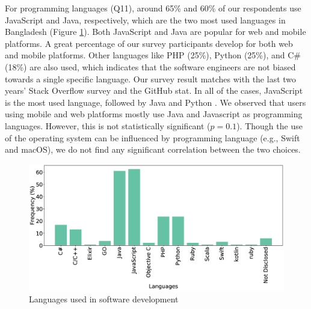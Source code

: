 For programming languages (Q11), around 65\% and 60\% of our respondents use JavaScript and
Java, respectively, which are the two most used languages in Bangladesh (Figure
\ref{fig:languages}). Both JavaScript and Java are popular for web and mobile
platforms. A great percentage of our survey participants develop for both
web and mobile platforms. Other languages
like PHP (25\%), Python (25\%), and C\# (18\%) are also used, which indicates
that the software engineers are not biased towards a single specific language.
Our survey result matches with the last two years' Stack Overflow survey and the
GitHub stat. In all of the cases, JavaScript is the most used language, followed
by Java and Python \cite{StackoverflowSurvey2020, StackoverflowSurvey2019,
GithubStat}. We
observed that users using mobile and web platforms mostly use Java and
Javascript as programming languages. However, this is not statistically
significant ($p=0.1$). Though the use of the operating system can be influenced by
programming language (e.g., Swift and macOS), we do not find any significant correlation
between the two choices.
\begin{figure}[t]
\centering
  \includegraphics[scale=0.18]{Figures/Respondents_languages}
  \caption{Languages used in software development}
  \label{fig:languages}
\end{figure}

